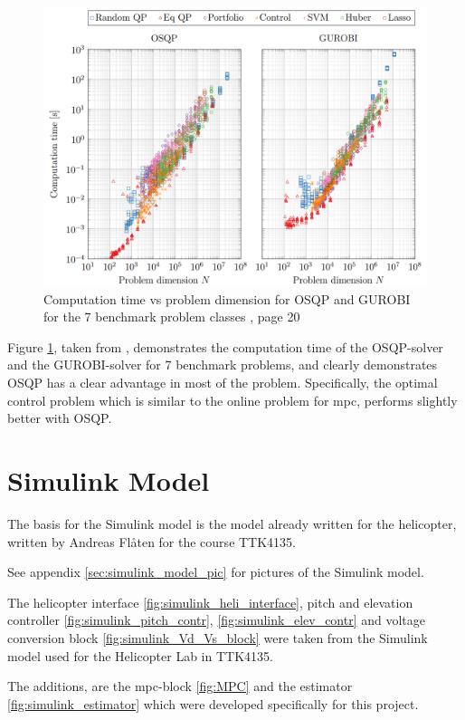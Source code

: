 \begin{figure}
    \centering
    \includegraphics[scale=0.4]{fig/benchmark_osqp.png}
    \caption{Computation time vs problem dimension for OSQP and GUROBI for the 7 benchmark problem classes \cite{osqp}, page 20}
    \label{fig:osqp_benchmark}
\end{figure}

Figure \ref{fig:osqp_benchmark}, taken from \cite{osqp}, demonstrates the computation time of the OSQP-solver and the GUROBI-solver for 7 benchmark problems, and clearly demonstrates OSQP has a clear advantage in most of the problem. Specifically, the optimal control problem which is similar to the online problem for \acrshort{mpc}, performs slightly better with OSQP. 


\section{Simulink Model}

The basis for the Simulink model is the model already written for the helicopter, written by Andreas Flåten for the course TTK4135. 

See appendix \ref{sec:simulink_model_pic} for pictures of the Simulink model.

The helicopter interface \ref{fig:simulink_heli_interface}, pitch and elevation controller \ref{fig:simulink_pitch_contr}, \ref{fig:simulink_elev_contr} and voltage conversion block \ref{fig:simulink_Vd_Vs_block} were taken from the Simulink model used for the Helicopter Lab in TTK4135. 

The additions, are the \acrshort{mpc}-block \ref{fig:MPC} and the estimator \ref{fig:simulink_estimator} which were developed specifically for this project. 

